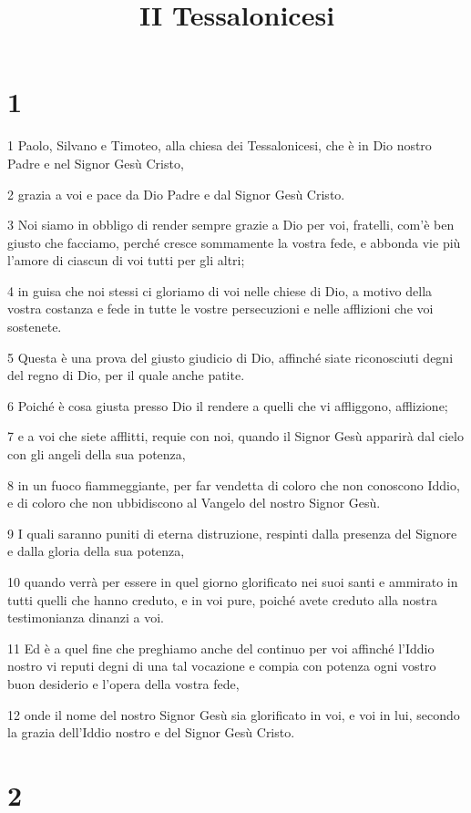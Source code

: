 

\title{II Tessalonicesi}


\chapter{1}

\par 1 Paolo, Silvano e Timoteo, alla chiesa dei Tessalonicesi, che è in Dio nostro Padre e nel Signor Gesù Cristo,
\par 2 grazia a voi e pace da Dio Padre e dal Signor Gesù Cristo.
\par 3 Noi siamo in obbligo di render sempre grazie a Dio per voi, fratelli, com'è ben giusto che facciamo, perché cresce sommamente la vostra fede, e abbonda vie più l'amore di ciascun di voi tutti per gli altri;
\par 4 in guisa che noi stessi ci gloriamo di voi nelle chiese di Dio, a motivo della vostra costanza e fede in tutte le vostre persecuzioni e nelle afflizioni che voi sostenete.
\par 5 Questa è una prova del giusto giudicio di Dio, affinché siate riconosciuti degni del regno di Dio, per il quale anche patite.
\par 6 Poiché è cosa giusta presso Dio il rendere a quelli che vi affliggono, afflizione;
\par 7 e a voi che siete afflitti, requie con noi, quando il Signor Gesù apparirà dal cielo con gli angeli della sua potenza,
\par 8 in un fuoco fiammeggiante, per far vendetta di coloro che non conoscono Iddio, e di coloro che non ubbidiscono al Vangelo del nostro Signor Gesù.
\par 9 I quali saranno puniti di eterna distruzione, respinti dalla presenza del Signore e dalla gloria della sua potenza,
\par 10 quando verrà per essere in quel giorno glorificato nei suoi santi e ammirato in tutti quelli che hanno creduto, e in voi pure, poiché avete creduto alla nostra testimonianza dinanzi a voi.
\par 11 Ed è a quel fine che preghiamo anche del continuo per voi affinché l'Iddio nostro vi reputi degni di una tal vocazione e compia con potenza ogni vostro buon desiderio e l'opera della vostra fede,
\par 12 onde il nome del nostro Signor Gesù sia glorificato in voi, e voi in lui, secondo la grazia dell'Iddio nostro e del Signor Gesù Cristo.

\chapter{2}

